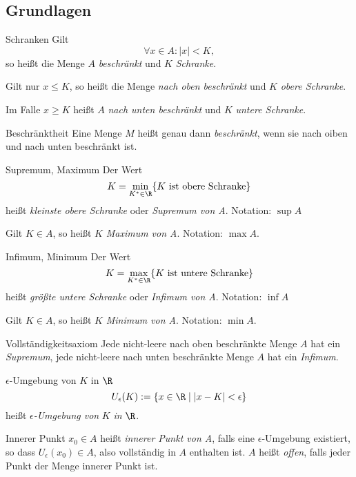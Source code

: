 \documentclass[german]{../spicker}
\renewcommand{\abs}[1]{\left| #1 \right|}
\begin{document}
\subsection{Grundlagen}
\begin{defi}{Schranken}
    Gilt $$\forall x\in A : \abs{x} < K,$$ so heißt die Menge $A$ \emph{beschränkt} und $K$ \emph{Schranke}.

    Gilt nur $x \leq K$, so heißt die Menge \emph{nach oben beschränkt} und $K$ \emph{obere Schranke}.

    Im Falle $x \geq K$ heißt $A$ \emph{nach unten beschränkt} und $K$ \emph{untere Schranke}.
\end{defi}

\begin{defi}{Beschränktheit}
    Eine Menge $M$ heißt genau dann \emph{beschränkt}, wenn sie nach oiben und nach unten beschränkt ist.
\end{defi}

\begin{defi}{Supremum, Maximum}
    Der Wert
    $$
        K= \min_{K^* \in \R} \{K \text{ ist obere Schranke}\}
    $$
    heißt \emph{kleinste obere Schranke} oder \emph{Supremum von A}.
    Notation: $\sup A$

    Gilt $K \in A$, so heißt $K$ \emph{Maximum von A}. Notation: $\max A$.
\end{defi}

\begin{defi}{Infimum, Minimum}
    Der Wert
    $$
        K= \max_{K^* \in \R} \{K \text{ ist untere Schranke}\}
    $$
    heißt \emph{größte untere Schranke} oder \emph{Infimum von A}.
    Notation: $\inf A$

    Gilt $K \in A$, so heißt $K$ \emph{Minimum von A}. Notation: $\min A$.
\end{defi}

\begin{bonus}{Vollständigkeitsaxiom}
    Jede nicht-leere nach oben beschränkte Menge $A$ hat ein \emph{Supremum}, jede nicht-leere nach unten beschränkte Menge $A$ hat ein \emph{Infimum}.
\end{bonus}

\begin{defi}{$\epsilon$-Umgebung von $K$ in $\R$}
    $$
        U_\epsilon(K) := \{ x \in \R \mid \abs{x - K} < \epsilon \}
    $$
    heißt $\epsilon$\emph{-Umgebung von} $K$ \emph{in} $\R$.
\end{defi}

\begin{defi}{Innerer Punkt}
    $x_0 \in A$ heißt \emph{innerer Punkt von A}, falls eine $\epsilon$-Umgebung existiert, so dass $U_\epsilon (x_0) \in A$, also vollständig in $A$ enthalten ist.
    $A$ heißt \emph{offen}, falls jeder Punkt der Menge innerer Punkt ist.
\end{defi}
\end{document}
